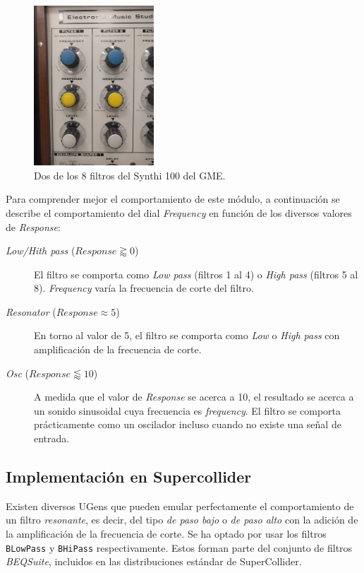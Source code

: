 \begin{figure}
	\centering
	\includegraphics[width=0.4\textwidth]{images/filters}
	\caption{Dos de los 8 filtros del Synthi 100 del GME.}
	\label{fig:filters}
\end{figure}

Para comprender mejor el comportamiento de este módulo, a continuación se describe el comportamiento del dial \textit{Frequency} en función de los diversos valores de \textit{Response}:

\begin{description}
	\item[\textit{Low/Hith pass} ($\textit{Response} \gtrapprox 0$)] El filtro se comporta como \textit{Low pass} (filtros 1 al 4) o \textit{High pass} (filtros 5 al 8). \textit{Frequency} varía la frecuencia de corte del filtro.
	\item[\textit{Resonator} ($\textit{Response} \approx 5$)] En torno al valor de 5, el filtro se comporta como \textit{Low} o \textit{High pass} con amplificación de la frecuencia de corte.
	\item[\textit{Osc} ($\textit{Response} \lessapprox 10$)] A medida que el valor de \textit{Response} se acerca a 10, el resultado se acerca a un sonido sinusoidal cuya frecuencia es \textit{frequency}. El filtro se comporta prácticamente como un oscilador incluso cuando no existe una señal de entrada. 
\end{description}

\subsection{Implementación en Supercollider}

Existen diversos UGens que pueden emular perfectamente el comportamiento de un filtro \textit{resonante}, es decir, del tipo \textit{de paso bajo} o \textit{de paso alto} con la adición de la amplificación de la frecuencia de corte. Se ha optado por usar los filtros \texttt{BLowPass} y \texttt{BHiPass} respectivamente. Estos forman parte del conjunto de filtros \textit{BEQSuite}, incluidos en las distribuciones estándar de SuperCollider. 

